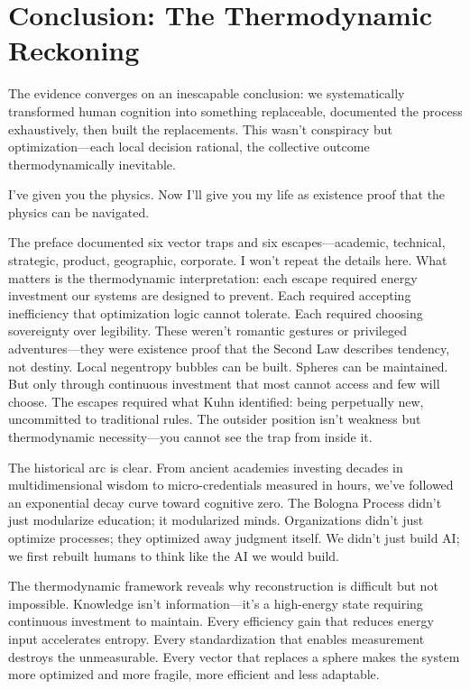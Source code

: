 \section{Conclusion: The Thermodynamic Reckoning}

The evidence converges on an inescapable conclusion: we systematically transformed human cognition into something replaceable, documented the process exhaustively, then built the replacements. This wasn't conspiracy but optimization—each local decision rational, the collective outcome thermodynamically inevitable.

I've given you the physics. Now I'll give you my life as existence proof that the physics can be navigated.

The preface documented six vector traps and six escapes—academic, technical, strategic, product, geographic, corporate. I won't repeat the details here. What matters is the thermodynamic interpretation: each escape required energy investment our systems are designed to prevent. Each required accepting inefficiency that optimization logic cannot tolerate. Each required choosing sovereignty over legibility. These weren't romantic gestures or privileged adventures—they were existence proof that the Second Law describes tendency, not destiny. Local negentropy bubbles can be built. Spheres can be maintained. But only through continuous investment that most cannot access and few will choose. The escapes required what Kuhn identified: being perpetually new, uncommitted to traditional rules. The outsider position isn't weakness but thermodynamic necessity—you cannot see the trap from inside it.

The historical arc is clear. From ancient academies investing decades in multidimensional wisdom to micro-credentials measured in hours, we've followed an exponential decay curve toward cognitive zero. The Bologna Process didn't just modularize education; it modularized minds. Organizations didn't just optimize processes; they optimized away judgment itself. We didn't just build AI; we first rebuilt humans to think like the AI we would build.

The thermodynamic framework reveals why reconstruction is difficult but not impossible. Knowledge isn't information—it's a high-energy state requiring continuous investment to maintain. Every efficiency gain that reduces energy input accelerates entropy. Every standardization that enables measurement destroys the unmeasurable. Every vector that replaces a sphere makes the system more optimized and more fragile, more efficient and less adaptable.

